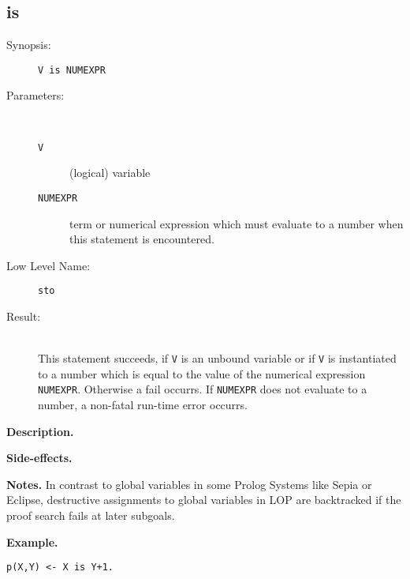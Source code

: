 %
%
%
\subsection{is}

\begin{description}
\item[Synopsis:]
	{\tt V is NUMEXPR}
\item[Parameters:]\ \\[-0.5cm]
	\begin{description}
	\item[{\tt V}]
(logical) variable
	\item[{\tt NUMEXPR}]
term or numerical expression which must evaluate to a number
        when this statement is encountered.
 

	\end{description}
\item[Low Level Name:]
	{\tt sto}
\item[Result:]\ \\
This statement succeeds, if {\tt V} is an unbound variable or
if {\tt V} is instantiated to a number which is equal to the value
of the numerical expression {\tt NUMEXPR}.
Otherwise a fail occurrs.
If {\tt NUMEXPR} does not evaluate to a number, a non-fatal run-time
error occurrs.
\end{description}

\vspace*{0.5cm}
\noindent
{\bf Description.}

\vspace*{0.5cm}
\noindent
{\bf Side-effects.}

\vspace*{0.5cm}
\noindent
{\bf Notes.}
In contrast to global variables in some Prolog Systems
         like Sepia or Eclipse, destructive assignments to
         global variables in LOP are backtracked if the proof
         search fails at later subgoals.





\vspace*{0.5cm}
\noindent
{\bf Example.}
\begin{verbatim}
p(X,Y) <- X is Y+1.
\end{verbatim}


